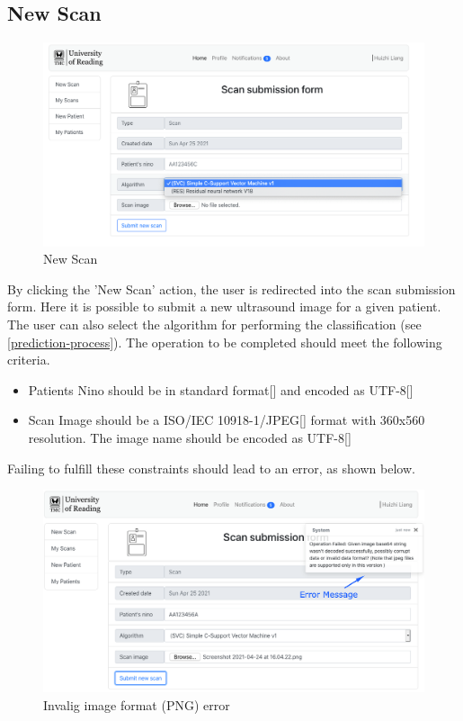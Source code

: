 		\subsection{New Scan}
			\label{new-scan}
			\begin{figure}[H]
				\iftrue
				\centering
				\caption{New Scan}
				\includegraphics[scale=0.3]{figures/newscan}
				\fi
			\end{figure}
			By clicking the 'New Scan' action, the user is redirected into the scan submission form. Here it is possible to 
			submit a new ultrasound image for a given patient. The user can also select the algorithm for performing the 
			classification (see \ref{prediction-process}). The operation to be completed should meet the following criteria.
			\begin{itemize}
				\item Patients Nino should be in standard format[\cite{nino-format}] and encoded as UTF-8[\cite{rfc3629}]
				\item Scan Image should be a ISO/IEC 10918-1/JPEG[\cite{jpeg-iso10918-1}] format with 360x560 resolution. The image name
				should be encoded as UTF-8[\cite{rfc3629}]
			\end{itemize}
			Failing to fulfill these constraints should lead to an error, as shown below.
			\begin{figure}[H]
				\iftrue
				\centering
				\caption{Invalig image format (PNG) error}
				\includegraphics[scale=0.3]{figures/newscan-error}
				\fi
			\end{figure}
			
			
			
			
			
			
			
		
	



